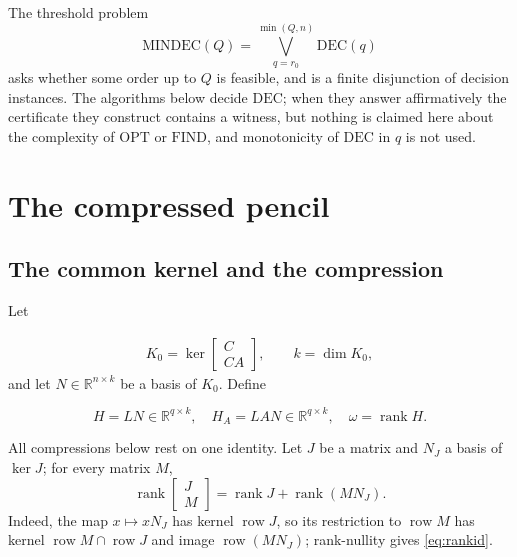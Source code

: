 \documentclass[journal]{IEEEtran}
\theoremstyle{plainn}
\begin{document}
The threshold problem
\begin{equation}\label{eq:mindec}
\mathrm{MINDEC}(Q)=\bigvee_{q=r_0}^{\min(Q,n)}\mathrm{DEC}(q)
\end{equation}
asks whether some order up to $Q$ is feasible, and is a finite disjunction of decision
instances. The algorithms below decide $\mathrm{DEC}$; when they answer affirmatively the
certificate they construct contains a witness, but nothing is claimed here about the
complexity of $\mathrm{OPT}$ or $\mathrm{FIND}$, and monotonicity of $\mathrm{DEC}$ in $q$
is not used.

\section{The compressed pencil}\label{sec:compressed}

\subsection{The common kernel and the compression}\label{sec:compress}
Let

\begin{equation}
\begin{gathered}
K_0=\ker\begin{bmatrix}C\\ CA\end{bmatrix},\qquad k=\dim K_0,
\end{gathered}
\end{equation}
and let $N\in\mathbb R^{n\times k}$ be a basis of $K_0$. Define

\begin{equation}
H=LN\in\mathbb R^{q\times k},\quad H_A=LAN\in\mathbb R^{q\times k},\quad
\omega=\operatorname{rank}H.
\end{equation}

All compressions below rest on one identity. Let $J$ be a matrix and $N_J$ a basis of
$\ker J$; for every matrix $M$,
\begin{equation}\label{eq:rankid}
\operatorname{rank}\begin{bmatrix}J\\M\end{bmatrix}
=\operatorname{rank}J+\operatorname{rank}(MN_J).
\end{equation}
Indeed, the map $x\mapsto xN_J$ has kernel $\operatorname{row}J$, so its restriction to
$\operatorname{row}M$ has kernel $\operatorname{row}M\cap\operatorname{row}J$ and image
$\operatorname{row}(MN_J)$; rank-nullity gives \eqref{eq:rankid}.
\end{document}
